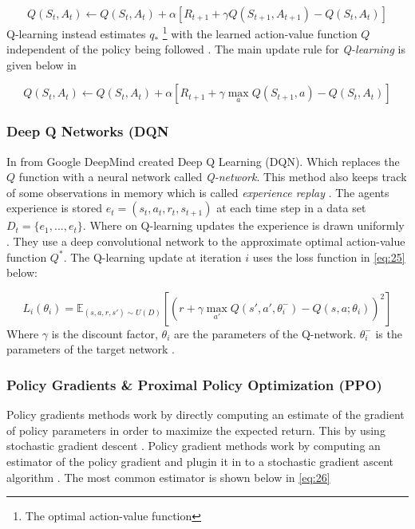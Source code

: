 \documentclass{kththesis}
\theoremstyle{definition}
\begin{document}
\begin{equation}
    \label{eq:23}
    Q(S_t, A_t) \leftarrow Q(S_t, A_t) + \alpha \left[R_{t+1} + \gamma Q(S_{t+1}, A_{t+1}) - Q(S_t, A_t) \right]
\end{equation}
Q-learning instead estimates  $q_{*}$ \footnote{The optimal action-value function} with the learned action-value function $Q$ independent of the policy being followed \parencite{sutton1998reinforcement}. 
The main update rule for \textit{Q-learning} is given below in 

\begin{equation}
    \label{eq:24}
     Q(S_t, A_t) \leftarrow Q(S_t, A_t) + \alpha \left[R_{t+1} + \gamma \underset{a}{\operatorname{max}} Q(S_{t+1}, a) - Q(S_t, A_t) \right]
\end{equation}

\subsubsection*{Deep Q Networks (DQN}
In \textcite{mnih2015human} from Google DeepMind created Deep Q Learning (DQN). Which replaces the $Q$ function with a neural network called \textit{Q-network}. This method also keeps track of some observations in memory which is called \textit{experience replay} \parencite{mnih2015human}. The agents experience is stored $e_t = (s_t, a_t, r_t, s_{t+1})$ at each time step in a data set $D_t = \{e_1, ..., e_t\}$. Where on Q-learning updates the experience is drawn uniformly \parencite{mnih2015human}. They use a deep convolutional network to the approximate optimal action-value function $Q^{*}$. The Q-learning update at iteration $i$ uses the loss function in \autoref{eq:25} below:

\begin{equation}
    \label{eq:25}
    L_i(\theta_i) = \mathbb{E}_{(s,a,r,s') \sim U(D)} \left[\left(r+ \gamma \underset{a'}{\operatorname{max}}Q(s', a', \theta_{i}^{-})-Q(s,a;\theta_i)  \right)^2 \right]
\end{equation}
Where $\gamma$ is the discount factor, $\theta_i$ are the parameters of the Q-network. $\theta_{i}^{-}$ is the parameters of the target network \parencite{mnih2015human}.


\subsubsection*{Policy Gradients \& Proximal Policy Optimization (PPO)}
Policy gradients methods work by  directly computing an estimate of the gradient of policy parameters in order to maximize the expected return. This by using stochastic gradient descent \parencite{bansal2017emergent}. 
Policy gradient methods work by computing an estimator of the policy gradient and plugin it in to a stochastic gradient ascent algorithm \parencite{schulman2017proximal}. The most common estimator is shown below in \autoref{eq:26}
\end{document}
